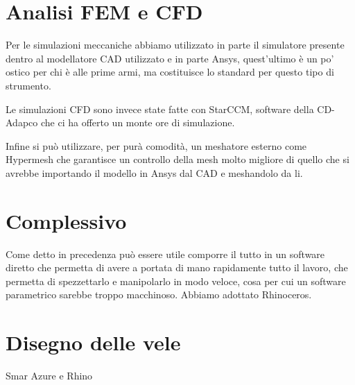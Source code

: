 	\section{Analisi FEM e CFD}
		Per le simulazioni meccaniche abbiamo utilizzato in parte il simulatore presente dentro al modellatore CAD utilizzato e in parte Ansys, quest'ultimo è un po' ostico per chi è alle prime armi, ma costituisce lo standard per questo tipo di strumento.
	
		Le simulazioni CFD sono invece state fatte con StarCCM, software della CD-Adapco che ci ha offerto un monte ore di simulazione.
	
		Infine si può utilizzare, per purà comodità, un meshatore esterno come Hypermesh che garantisce un controllo della mesh molto migliore di quello che si avrebbe importando il modello in Ansys dal CAD e meshandolo da li.
	
	\section{Complessivo}
		Come detto in precedenza può essere utile comporre il tutto in un software diretto che permetta di avere a portata di mano rapidamente tutto il lavoro, che permetta di spezzettarlo e manipolarlo in modo veloce, cosa per cui un software parametrico sarebbe troppo macchinoso. Abbiamo adottato Rhinoceros.
	
	\section{Disegno delle vele}
		Smar Azure e Rhino